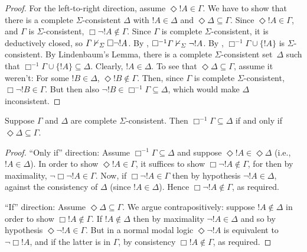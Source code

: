 \documentclass[../../../include/open-logic-section]{subfiles}
\begin{document}
{\begin{proof}
  For the left-to-right direction, assume $\Diamond !A \in \Gamma$. We
  have to show that there is a complete $\Sigma$-consistent $\Delta$
  with $!A \in \Delta$ and $\Diamond\Delta \subseteq \Gamma$.  Since
  $\Diamond !A \in \Gamma$, and $\Gamma$ is $\Sigma$-consistent,
  $\Box\lnot !A \notin \Gamma$. Since $\Gamma$ is complete
  $\Sigma$-consistent, it is deductively closed, so $\Gamma
  \Proves/[\Sigma] \Box\lnot !A$.  By ,
  $\Box^{-1}\Gamma \Proves/[\Sigma] \lnot !A$. By
  ,
  $\Box^{-1}\Gamma \cup \{ !A \}$ is $\Sigma$-consistent. By
  Lindenbaum's Lemma, there is a complete $\Sigma$-consistent
  set~$\Delta$ such that $\Box^{-1}\Gamma \cup \{ !A \} \subseteq
  \Delta$. Clearly, $!A \in \Delta$.  To see that $\Diamond\Delta
  \subseteq \Gamma$, assume it weren't: For some $!B \in \Delta$,
  $\Diamond !B \notin \Gamma$. Then, since $\Gamma$ is complete
  $\Sigma$-consistent, $\Box\lnot !B \in \Gamma$. But then also $\lnot
  !B \in \Box^{-1}\Gamma \subseteq \Delta$, which would make $\Delta$
  inconsistent.
\end{proof}
}

\begin{lem}
  Suppose $\Gamma$ and $\Delta$ are complete
  $\Sigma$-consistent. Then $\Box^{-1}\Gamma \subseteq \Delta$ if and
  only if $\Diamond\Delta \subseteq \Gamma$.
\end{lem}

\begin{proof}
  ``Only if'' direction: Assume $\Box^{-1}\Gamma \subseteq \Delta$ and
  suppose $\Diamond!A \in \Diamond\Delta$ (i.e., $!A \in \Delta$).  In
  order to show $\Diamond!A \in \Gamma$, it suffices to show
  $\Box\lnot!A \notin \Gamma$, for then by maximality, $\lnot\Box\lnot
  !A \in \Gamma$. Now, if $\Box\lnot!A \in \Gamma$ then by hypothesis
  $\lnot!A \in \Delta$, against the consistency of $\Delta$ (since $!A
  \in \Delta$). Hence $\Box\lnot!A \notin \Gamma$, as required.

  ``If'' direction: Assume $\Diamond\Delta
  \subseteq \Gamma$. We argue contrapositively: suppose $!A
  \notin \Delta$ in order to show $\Box!A \notin \Gamma$. If
  $!A \notin \Delta$ then by maximality $\lnot!A \in \Delta$
  and so by hypothesis $\Diamond\lnot!A \in \Gamma$. But in a
  normal modal logic $\Diamond\lnot!A$ is equivalent to
  $\lnot\Box !A$, and if the latter is in $\Gamma$, by consistency
  $\Box!A \notin\Gamma$, as required.
\end{proof}
\end{document}
